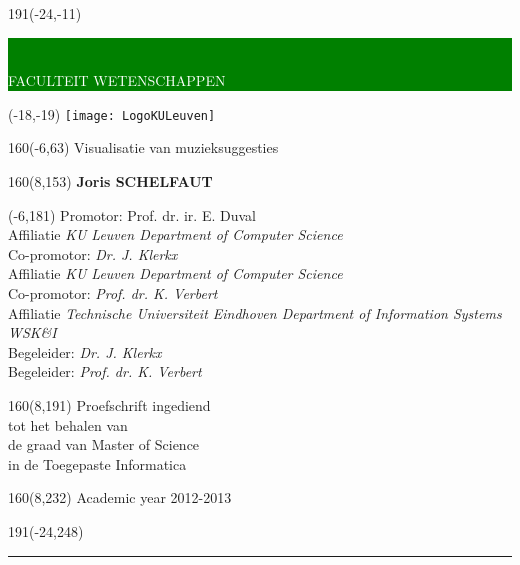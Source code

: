 \thispagestyle{empty}
\newcommand{\form}[1]{\scalebox{1.087}{\boldmath{#1}}}
\sffamily
%
\begin{textblock}{191}(-24,-11)
	\colorbox{green}{\hspace{139mm}\ \parbox[c][18truemm]{62mm}{\textcolor{white}{FACULTEIT WETENSCHAPPEN}}}
\end{textblock}
%
\begin{textblock}{70}(-18,-19)
	\textblockcolour{}
	\texttt{[image: LogoKULeuven]}
\end{textblock}
%
\begin{textblock}{160}(-6,63)
	\textblockcolour{}
	\vspace{-\parskip}
	\flushleft
	\fontsize{40}{42}\selectfont \textcolor{bluetitle}{Visualisatie van muzieksuggesties}\\[1.5mm]
	\fontsize{20}{22}\selectfont {A visueel uitlegsysteem voor collaboratieve filtering}
\end{textblock}

\begin{textblock}{160}(8,153)
\textblockcolour{}
\vspace{-\parskip}
\flushright
\fontsize{14}{16}\selectfont \textbf{Joris SCHELFAUT}
\end{textblock}
%
\begin{textblock}{90}(-6,181)
\textblockcolour{}
\vspace{-\parskip}
\flushleft
Promotor: Prof. dr. ir. E. Duval\\[-2pt]
\textcolor{blueaff}{Affiliatie \textsl{KU Leuven Department of Computer Science}}\\[5pt]
Co-promotor: \textsl{Dr. J. Klerkx}\\[-2pt]
\textcolor{blueaff}{Affiliatie \textsl{KU Leuven Department of Computer Science}}\\[5pt]
Co-promotor: \textsl{Prof. dr. K. Verbert}\\[-2pt]
\textcolor{blueaff}{Affiliatie \textsl{Technische Universiteit Eindhoven Department of Information Systems WSK\&I}}\\[5pt]
Begeleider: \textsl{Dr. J. Klerkx}\\[-2pt]
Begeleider: \textsl{Prof. dr. K. Verbert}\\[-2pt]
\end{textblock}
%
\begin{textblock}{160}(8,191)
\textblockcolour{}
\vspace{-\parskip}
\flushright
Proefschrift ingediend\\[4.5pt]
tot het behalen van\\[4.5pt]
de graad van Master of Science\\[4.5pt]
in de Toegepaste Informatica\\
\end{textblock}
%
\begin{textblock}{160}(8,232)
\textblockcolour{}
\vspace{-\parskip}
\flushright
Academic year 2012-2013
\end{textblock}
%
\begin{textblock}{191}(-24,248)
{\color{blueline}\rule{550pt}{5.5pt}}
\end{textblock}
%
\vfill